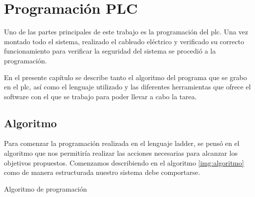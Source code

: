 \chapter{Programación PLC}
\label{ch:progPLC}

Uno de las partes principales de este trabajo es la programación del \gls{plc}. 
Una vez montado todo el sistema, 
realizado el cableado eléctrico y verificado su correcto funcionamiento
para verificar la seguridad del sistema se procedió a la programación.

En el presente capítulo se describe tanto el algoritmo del programa que se grabo
en el \gls{plc}, así como el 
lenguaje utilizado y las diferentes herramientas que ofrece el software 
con el que se trabajo para poder llevar a cabo la tarea.

\section{Algoritmo}
\label{sec:Algoritmo}
Para comenzar la programación realizada en el lenguaje ladder,
se pensó en el algoritmo que nos permitiría realizar las acciones
necesarias para alcanzar los objetivos propuestos. Comenzamos describiendo
en el algoritmo \ref{img:algoritmo} como de manera estructurada nuestro
sistema debe comportarse.

\begin{algorithm}[H]

  
 \caption{Algoritmo de programación}
 \label{img:algoritmo}
\end{algorithm}

